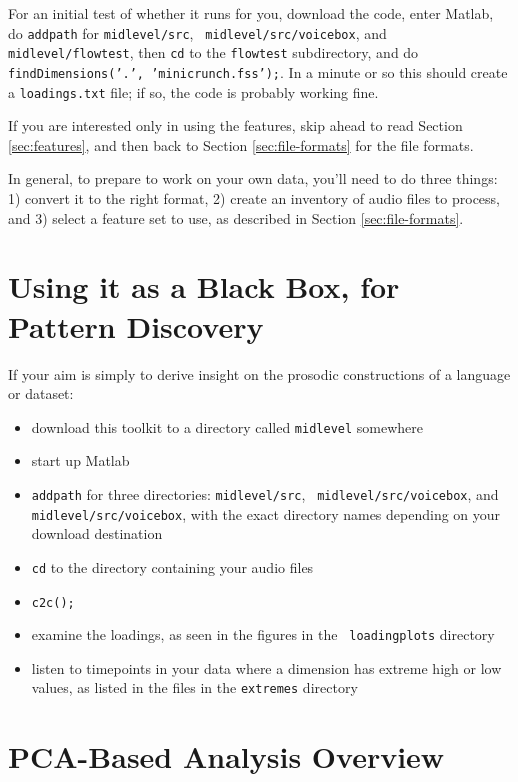 \documentclass[11pt]{article}
\begin{document}
For an initial test of whether it runs for you, download the code,
enter Matlab, do {\tt addpath} for {\tt midlevel/src}, {\tt
  midlevel/src/voicebox}, and {\tt midlevel/flowtest}, then {\tt cd}
to the {\tt flowtest} subdirectory, and do {\tt
  findDimensions('.', 'minicrunch.fss');}. In a minute or
so this should create a {\tt loadings.txt} file; if so, the code is
probably working fine.

If you are interested only in using the features, skip ahead to read
Section \ref{sec:features}, and then back to Section
\ref{sec:file-formats} for the file formats.

In general, to prepare to work on your own data, you'll need to do
three things: 1) convert it to the right format, 2) create an
inventory of audio files to process, and 3) select a feature set to
use, as described in Section \ref{sec:file-formats}.


\section{Using it as a Black Box, for Pattern Discovery} \label{sec:blackbox}

If your aim is simply to derive insight on the prosodic constructions
of a language or dataset:

\begin{itemize}   \setlength{\itemsep}{0pt}\setlength{\parskip}{0pt}
\item download this toolkit to a directory called {\tt midlevel} somewhere 
\item start up Matlab
\item {\tt addpath} for three directories: {\tt midlevel/src}, {\tt
  midlevel/src/voicebox}, and {\tt midlevel/src/voicebox}, with the
  exact directory names depending on your download destination
\item {\tt cd} to the directory containing your audio files
\item {\tt c2c();}
\item examine the loadings, as seen in the figures in the {\tt
  loadingplots} directory
\item listen to timepoints in your data where a dimension has extreme
  high or low values, as listed in the files in the {\tt extremes}
  directory
\end{itemize}


\section{PCA-Based Analysis Overview }   \label{sec:pca-overview}
\end{document}
